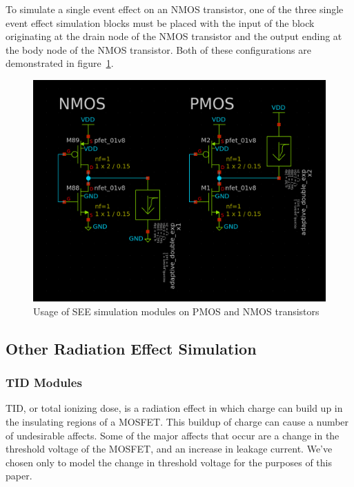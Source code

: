\documentclass[conference]{IEEEtran}
\begin{document}
    To simulate a single event effect on an NMOS transistor, one of the three single event effect simulation blocks must be placed with the input of the block originating at the drain node of the NMOS transistor and the output ending at the body node of the NMOS transistor.
    Both of these configurations are demonstrated in figure~\ref{fig:SEE_Usage}.

    \begin{figure}[htbp]
        \centering
        \includegraphics[width=0.9\linewidth]{PMOS_NMOS_Usage}
        \caption{Usage of SEE simulation modules on PMOS and NMOS transistors}
        \label{fig:SEE_Usage}
    \end{figure}

    \vspace{1em}

    \subsection{Other Radiation Effect Simulation}
    \label{subsec:other-radiation-effect-simulation}

    \subsubsection{TID Modules}
    TID, or total ionizing dose, is a radiation effect in which charge can build up in the insulating regions of a MOSFET. This buildup of charge can cause a number of undesirable affects.
    Some of the major affects that occur are a change in the threshold voltage of the MOSFET, and an increase in leakage current.
    We've chosen only to model the change in threshold voltage for the purposes of this paper.
\end{document}
